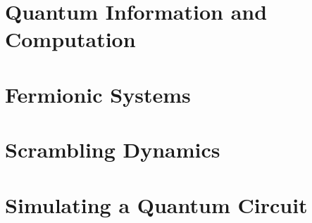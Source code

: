 \documentclass[aps]{revtex4-2}
\begin{document}
% 
















\section{Quantum Information and Computation}




\section{Fermionic Systems}

\section{Scrambling Dynamics}


\section{Simulating a Quantum Circuit}
\end{document}

